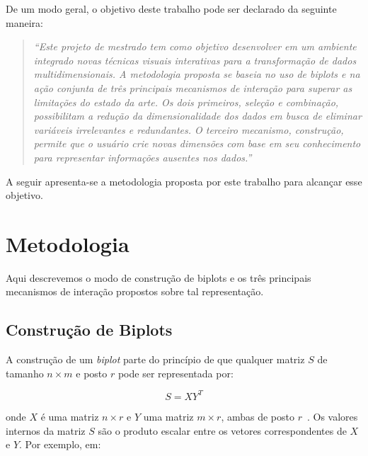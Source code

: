De um modo geral, o objetivo deste trabalho pode ser
declarado da seguinte maneira:

\begin{quote} \emph{``Este projeto de mestrado tem como
        objetivo desenvolver em um ambiente integrado novas
        técnicas visuais interativas para a transformação de
        dados multidimensionais. A metodologia proposta se
        baseia no uso de biplots e na ação conjunta de três
        principais mecanismos de interação para superar as
        limitações do estado da arte. Os dois primeiros,
        seleção e combinação, possibilitam a redução da
        dimensionalidade dos dados em busca de eliminar
        variáveis irrelevantes e redundantes. O terceiro
        mecanismo, construção, permite que o usuário crie
        novas dimensões com base em seu conhecimento para
        representar informações ausentes nos dados.''}
\end{quote}

A seguir apresenta-se a metodologia proposta por este
trabalho para alcançar esse objetivo. 

\section{Metodologia}

Aqui descrevemos o modo de construção de biplots e os três
principais mecanismos de interação propostos sobre tal
representação. 

\subsection{Construção de Biplots}

A construção de um \emph{biplot} parte do princípio de que qualquer
matriz $S$ de tamanho $n \times m$ e posto $r$  pode
ser representada por:

\begin{equation}\label{eq:bp}
    S = XY^T
\end{equation}

onde $X$ é uma matriz $n \times r$ e $Y$ uma matriz $m
\times r$, ambas de posto $r$~\cite{Gabriel1971}. Os valores
internos da matriz $S$ são o produto escalar entre os
vetores correspondentes de $X$ e $Y$. Por exemplo, em:

